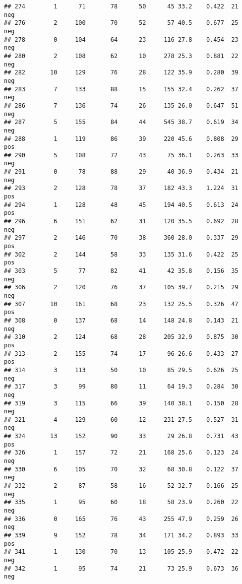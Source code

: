\documentclass[
]{article}
\begin{document}
\begin{verbatim}
## 274        1      71       78      50      45 33.2    0.422  21      neg
## 276        2     100       70      52      57 40.5    0.677  25      neg
## 278        0     104       64      23     116 27.8    0.454  23      neg
## 280        2     108       62      10     278 25.3    0.881  22      neg
## 282       10     129       76      28     122 35.9    0.280  39      neg
## 283        7     133       88      15     155 32.4    0.262  37      neg
## 286        7     136       74      26     135 26.0    0.647  51      neg
## 287        5     155       84      44     545 38.7    0.619  34      neg
## 288        1     119       86      39     220 45.6    0.808  29      pos
## 290        5     108       72      43      75 36.1    0.263  33      neg
## 291        0      78       88      29      40 36.9    0.434  21      neg
## 293        2     128       78      37     182 43.3    1.224  31      pos
## 294        1     128       48      45     194 40.5    0.613  24      pos
## 296        6     151       62      31     120 35.5    0.692  28      neg
## 297        2     146       70      38     360 28.0    0.337  29      pos
## 302        2     144       58      33     135 31.6    0.422  25      pos
## 303        5      77       82      41      42 35.8    0.156  35      neg
## 306        2     120       76      37     105 39.7    0.215  29      neg
## 307       10     161       68      23     132 25.5    0.326  47      pos
## 308        0     137       68      14     148 24.8    0.143  21      neg
## 310        2     124       68      28     205 32.9    0.875  30      pos
## 313        2     155       74      17      96 26.6    0.433  27      pos
## 314        3     113       50      10      85 29.5    0.626  25      neg
## 317        3      99       80      11      64 19.3    0.284  30      neg
## 319        3     115       66      39     140 38.1    0.150  28      neg
## 321        4     129       60      12     231 27.5    0.527  31      neg
## 324       13     152       90      33      29 26.8    0.731  43      pos
## 326        1     157       72      21     168 25.6    0.123  24      neg
## 330        6     105       70      32      68 30.8    0.122  37      neg
## 332        2      87       58      16      52 32.7    0.166  25      neg
## 335        1      95       60      18      58 23.9    0.260  22      neg
## 336        0     165       76      43     255 47.9    0.259  26      neg
## 339        9     152       78      34     171 34.2    0.893  33      pos
## 341        1     130       70      13     105 25.9    0.472  22      neg
## 342        1      95       74      21      73 25.9    0.673  36      neg

\end{verbatim}
\end{document}
